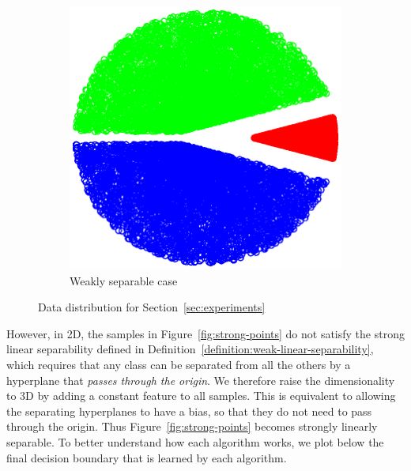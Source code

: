 \begin{figure}[h]
\begin{subfigure}[b]{0.23\textwidth}
        \hspace*{-0.3cm}  \includegraphics[width=1.15\textwidth, trim={0, 0cm, 0, 0}, clip]{figures/weak_points}
         \caption{Weakly separable case}
    \end{subfigure}
    \vspace*{-0.2cm}
    \caption{Data distribution for Section~\ref{sec:experiments}}
\end{figure}

However, in 2D, the samples in Figure~\ref{fig:strong-points} do not satisfy the strong linear separability defined in Definition~\ref{definition:weak-linear-separability}, which requires that any class can be separated from all the others by a hyperplane that \textit{passes through the origin}. We therefore raise the dimensionality to 3D by adding a constant feature to all samples. This is equivalent to allowing the separating hyperplanes to have a bias, so that they do not need to pass through the origin. Thus Figure~\ref{fig:strong-points} becomes strongly linearly separable. To better understand how each algorithm works, we plot below the final decision boundary that is learned by each algorithm. 

